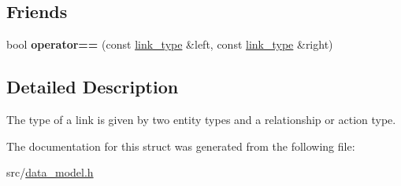 \subsection*{Friends}
\begin{DoxyCompactItemize}
\item 
\mbox{\label{structtricl_1_1link__type_ae75460e218908d70af1163248317096e}} 
bool {\bfseries operator==} (const \hyperlink{structtricl_1_1link__type}{link\+\_\+type} \&left, const \hyperlink{structtricl_1_1link__type}{link\+\_\+type} \&right)
\end{DoxyCompactItemize}


\subsection{Detailed Description}
The type of a link is given by two entity types and a relationship or action type. 

The documentation for this struct was generated from the following file\+:\begin{DoxyCompactItemize}
\item 
src/\hyperlink{data__model_8h}{data\+\_\+model.\+h}\end{DoxyCompactItemize}
